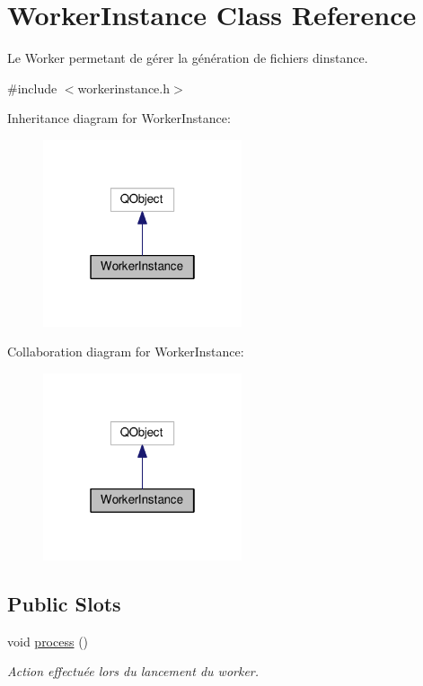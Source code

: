 \hypertarget{classWorkerInstance}{}\section{Worker\+Instance Class Reference}
\label{classWorkerInstance}


Le Worker permetant de gérer la génération de fichiers d\textquotesingle{}instance.  




{\ttfamily \#include $<$workerinstance.\+h$>$}



Inheritance diagram for Worker\+Instance\+:\nopagebreak
\begin{figure}[H]
\begin{center}
\leavevmode
\includegraphics[width=166pt]{classWorkerInstance__inherit__graph}
\end{center}
\end{figure}


Collaboration diagram for Worker\+Instance\+:\nopagebreak
\begin{figure}[H]
\begin{center}
\leavevmode
\includegraphics[width=166pt]{classWorkerInstance__coll__graph}
\end{center}
\end{figure}
\subsection*{Public Slots}
\begin{DoxyCompactItemize}
\item 
void \hyperlink{classWorkerInstance_ab9005529d8aa529d74226d8e4a1e9f3f}{process} ()
\begin{DoxyCompactList}\small\item\em Action effectuée lors du lancement du worker. \end{DoxyCompactList}\end{DoxyCompactItemize}
